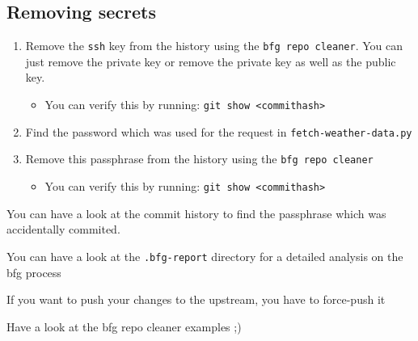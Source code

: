 \documentclass[paper=a4]{scrartcl}
\begin{document}
	\subsection*{Removing secrets}
		\begin{enumerate}
			\item Remove the \texttt{ssh} key from the history using the \texttt{bfg repo cleaner}. You can just remove the private key or remove the private key as well as the public key.
				\begin{itemize}
					\item 	You can verify this by running: \texttt{git show <commithash>}
				\end{itemize}
			\item Find the password which was used for the request in \texttt{fetch-weather-data.py}
			\item Remove this passphrase from the history using the \texttt{bfg repo cleaner}
				\begin{itemize}
					\item 	You can verify this by running: \texttt{git show <commithash>}
				\end{itemize}
		\end{enumerate}

	\begin{hints}
  		\item 	You can have a look at the commit history to find the passphrase which was accidentally commited.
  		\item 	You can have a look at the \texttt{.bfg-report} directory for a detailed analysis on the bfg process
  		\item 	If you want to push your changes to the upstream, you have to force-push it
  		\item 	Have a look at the bfg repo cleaner examples ;)
	\end{hints}
\end{document}

